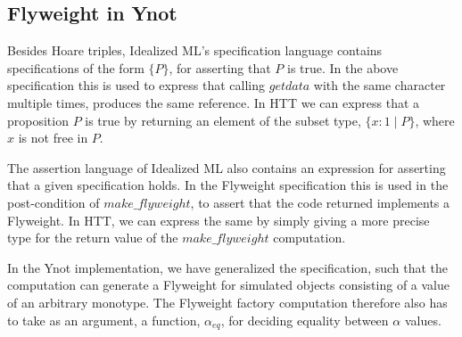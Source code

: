 \subsection{Flyweight in Ynot}
\label{sec:ynot-flyweight}

Besides Hoare triples, Idealized ML's specification language contains
specifications of the form $\{ P \}$, for asserting that $P$ is true. In the
above specification this is used to express that calling $getdata$ with the
same character multiple times, produces the same reference. In HTT we can
express that a proposition $P$ is true by returning an element of
the subset type, $\{ x : 1 \mid P \}$, where $x$ is not free in $P$. 

The assertion language of Idealized ML also contains an expression for
asserting that a given specification holds. In the Flyweight specification
this is used in the post-condition of $make\_flyweight$, to assert that the
code returned implements a Flyweight. In HTT, we can express the same by
simply giving a more precise type for the return value of the
$make\_flyweight$ computation.

In the Ynot implementation, we 
have generalized the specification, such that the computation can
generate a Flyweight for simulated objects consisting of a value of an
arbitrary monotype. The Flyweight factory computation therefore also has to
take as an argument, a function, $\alpha_{eq}$, for deciding 
equality between $\alpha$ values. 

